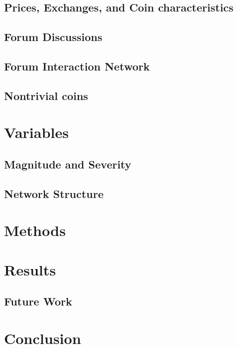 \documentclass{acm_proc_article_sp}%
\begin{document}
\subsection{Prices, Exchanges, and Coin characteristics}


\subsection{Forum Discussions}


\subsection{Forum Interaction Network}


\subsection{Nontrivial coins}


\section{Variables}
\subsection{Magnitude and Severity} \label{variables_nikete}


\subsection{Network Structure}


\section{Methods }


\section{Results}




\subsection{Future Work}


\section{Conclusion}

\end{document}

